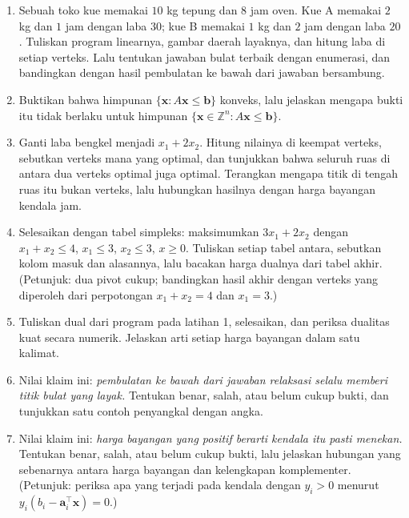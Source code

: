 \begin{latihan}
\begin{enumerate}
  \item Sebuah toko kue memakai $10$ kg tepung dan $8$ jam oven. Kue A memakai $2$ kg dan
        $1$ jam dengan laba $30$; kue B memakai $1$ kg dan $2$ jam dengan laba $20$.
        Tuliskan program linearnya, gambar daerah layaknya, dan hitung laba di setiap
        verteks. Lalu tentukan jawaban bulat terbaik dengan enumerasi, dan bandingkan
        dengan hasil pembulatan ke bawah dari jawaban bersambung.

  \item Buktikan bahwa himpunan $\{\mathbf{x}:A\mathbf{x}\le\mathbf{b}\}$ konveks, lalu
        jelaskan mengapa bukti itu tidak berlaku untuk himpunan
        $\{\mathbf{x}\in\mathbb{Z}^{n}:A\mathbf{x}\le\mathbf{b}\}$.

  \item Ganti laba bengkel menjadi $x_{1}+2x_{2}$. Hitung nilainya di keempat verteks,
        sebutkan verteks mana yang optimal, dan tunjukkan bahwa seluruh ruas di antara
        dua verteks optimal juga optimal. Terangkan mengapa titik di tengah ruas itu bukan
        verteks, lalu hubungkan hasilnya dengan harga bayangan kendala jam.

  \item Selesaikan dengan tabel simpleks: maksimumkan $3x_{1}+2x_{2}$ dengan
        $x_{1}+x_{2}\le4$, $x_{1}\le3$, $x_{2}\le3$, $x\ge0$. Tuliskan setiap tabel antara,
        sebutkan kolom masuk dan alasannya, lalu bacakan harga dualnya dari tabel akhir.
        (Petunjuk: dua pivot cukup; bandingkan hasil akhir dengan verteks yang diperoleh
        dari perpotongan $x_{1}+x_{2}=4$ dan $x_{1}=3$.)

  \item Tuliskan dual dari program pada latihan 1, selesaikan, dan periksa dualitas kuat
        secara numerik. Jelaskan arti setiap harga bayangan dalam satu kalimat.

  \item Nilai klaim ini: \emph{pembulatan ke bawah dari jawaban relaksasi selalu memberi
        titik bulat yang layak.} Tentukan benar, salah, atau belum cukup bukti, dan
        tunjukkan satu contoh penyangkal dengan angka.

  \item Nilai klaim ini: \emph{harga bayangan yang positif berarti kendala itu pasti
        menekan.} Tentukan benar, salah, atau belum cukup bukti, lalu jelaskan hubungan
        yang sebenarnya antara harga bayangan dan kelengkapan komplementer.
        (Petunjuk: periksa apa yang terjadi pada kendala dengan $y_{i}>0$ menurut
        $y_{i}(b_{i}-\mathbf{a}_{i}^{\top}\mathbf{x})=0$.)


\end{enumerate}
\end{latihan}
